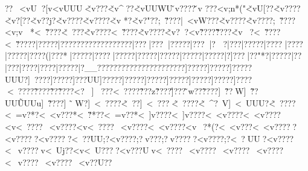 {{{{{{{{{{{{{{{{{{{{{{{{{{{{{{{{{{{{{{{{{{{{{{{{{{{{{{{{{{{{{{{{{{{{{{{{{{{{{{{{{{{{{{{{{{{{{{{{{{{{{{{{{{{{{{{{{{{{{{{{{{{{{{{{{{{{{{{{{{{{{{{{{{{{{{{{{{{{{{{{{{{{{{{{{{{{{{{{{{{{{{{{{{{{{{{{{{{{{{{{{{{{{{{{{{{{{{{{{{{{{{{{{{{{{{{{{{{{{{{{{{{{{{{{{{{{{{{{{{{{{{{{{{{{{{{{{{{{{{{{{{{{{{{{{{{{{{{{{{{{{{{{{{{{{{{{{{{{{{{{{{{{{{{{{{{{{{{{{{{{{{{{{{{{{{{{{{{{{{{{{{{{{{{{{{{{{{{{{{{{{{{{{{{{{{{{{{{{{{{{{{{{{{{{{{{{{{{{{{{{{{{{{{{{{{{{{{{{{{{{{{{{{{{{{{{{{{{{{{{{{{{{{{{{{{{{{{{{{{{{{{{{{{{{{{{{{{{{{{{{{{{{{{{{{{{{{{{{{{{{{{{{{{{{{{{{{{{{{{{{{{{{{{{{{{{{{{{{{{{{{{{{{{{{{{{{{{{{{{{{{{{{{{{{{{{{{{{{{{{{{{{{{{{{{{{{{{{{{{{{{{{{{{{{{{{{{{{{{{{{{{{{{{{{{{{{{{{{{{{{{{{{{{{{{{{{{{{{{{{{{{{{{{{{{{{{{{{{{{{{{{{{{{{{{{{{{{{{{{{{{{{{{{{{{{{{{{{{{{{{{{{{{{{{{{{{{{{{{{{{{{{{{{{{{{{{{{{{{{{{{{{{{{{{{{{{{{{{{{{{{{{{{{{{{{{{{{{{{{{{{{{{{{{{{{{{{{{{{{{{{{{{{{{{{{{{{{{{{{{{{{{{{{{{{{{{{{{{{{{{{{{{{{{{{{{{{{{{{{{{{{{{{{{{{{{{{{{{{{{{{{{{{{{{{{{{{{{{{{{{{{{{{{{{{{{{{{{{{{{{{{{{{{{{{{{{{{{{{{{{{{{{{{{{{{{{{{{{{{{{{{{{{{{{{{{{{{{{{{{{{{{{{{{{{{{{{{{{{{{{{{{{{{{{{{{{{{{{{{{{{{{{{{{{{{{{{{{{{{{{{{{{{{{{{{{{{{{{{{{{{{{{{{{{{{{{{{{{{{{{{{{{{{{{{{{{{{{{{{{{{{{{{{{{{{{{{{{{{{{{{{{{{{{{{{{{{{{{{{{{{{{{{{{{{{{{{{{{{{{{{{{{{{{{{{{{{{{{{{{{{{{{{{{{{{{{{{{{{{{{{{{{{{{{{{{{{{{{{{{{{{{{{{{{{{{{{{{{{{{{{{{{{{{{{{{{{{{{{{{{{{{{{{{{{{{{{{{{{{{{{{{{{{{{{{{{{{{{{{{{{{{{{{{{{{{{{{{{{{{{{{{{{{{{{{{{{{{{{{{{{{{{{{{{{{{{{{{{{{{{{{{{{{{{{{{{{{{{{{{{{{{{{{{{{{{{{{{{{{{{{{{{{{{{{{{{{{{{{{{{{{{{{{{{{{{{{{{{{{{{{{{{{{{{{{{{{{{{{{{{{{{{{{{{{{{{{{{{{{{{{{{{{{{{{{{{{{{{{{{{{{{{{{{{{{{{{{{{{{{{{{{{{{{{{{{{{{{{{{{{{{{{{{{{{{{{{{{{{{{{{{{{{{{{{{{{{{{{{{{{{{{{{{{{{{{{{{{{{{{{{{{{{{{{{{{{{{{{{{{{{{{{{{{{{{{{{{{{{{{{{{{{{{{{{{{{{{{{{{{{{{{{{{{{{{{{{{{{{{{{{{{{{{{{{{{{{{{{{{{{{{{{{{{{{{{{{{{{{{{{{{{{{{{{{{{{{{{{{{{{{{{{{{{{{{{{{{{{{{{{{{{{{{{{{{{{{{{{{{{{{{{{{{{{{{{{{{{{{{{{{{{{{{{{{{{{{{{{{{{{{{{{{{{{{{{{{{{{{{{{{{{{{{{{{{{{{{{{{{{{{{{{{{{{{{{{{{{{{{{{{{{{{{{{{{{{{{{{{{{{{{{{{{{{{{{{{{{{{{{{{{{{{{{{{{{{{{{{{{{{{{{{{{{{{{{{{{{{{{{{{{{{{{{{{{{{{{{{{{{{{{{{{{{{{{{{{{{{{{{{{{{{{{{{{{{{{{{{{{{{{{{{{{{{{{{{{{{{{{{{{{{{{{{{{{{{{{{{{{{{{{{{{{{{{{{{{{{{{{{{{{{{{{{{{{{{{{{{{{{{{{{{{{{{{{{{{{{{{{{{{{{{{{{{{{{{{{{{{{{{{{{{{{{{{??~<vU?[v<vUUU\v<v???}\v<v^??\v<vUUWU\vv????\vv
???<v;n *("\v<vU[??\v<v????\v<v?[??\v<v??j?\v<v????\v<v????\v<v
* ?\v<v?"??;~\v????|~<vW???\v<v????\~<v????;~\v????<v;v
*<~\v????\v<~ ???\~<v????<~\v????\~<v????\~<v??<v\~????\v\~????\v<v?<~\v????<~\v????}?|?????|?\?? ? }?\?????}?\?????}?\?????|?\??? |?\???|?\?????|?\???|?\?
?|?\???|?\?????|?\????
|?\????
|?\?????|?\????(|?\???*|?\?????|?\????|?\?????|?\?????|?\?????|?\?????|?\?????|?]??? |?\??"*?|?\?????|?\??   |?\???  |?\???? |?\????|?\?????|?\?__??}?\?????}?\?????}?\?????}?\?????]?\?????]?\?????]?\?????\?\?UUU?\?]~????]?\?????]?\???UU\?]?????]?\?????]?\?????]?\?????]?\?????]?\?????]?\????\?<~????\?\~????\?\~??\?\~????\?<? \?]~
???\?<~????\?\~???z\?\~????\?\~]???\?\~w??\?\~????]~\~??W]~\~??UU\?\~UUUu]~\~????]~\~W?]~<~????\~<~??]~<~???\~<~????\~<~^?~V]~<~UUU?\~<~????<~=v?* ?<~<v???*<~\v?*??<~=v??* <~]v????<~]v????<~<v????<~<v????<v<~????~<v????<v<~????~<v????<~<v????<v~?*(?<~<v???<~<v?????<v?????<v?????<~??UU;?<v????;?v ???;?v?????<v????;?<~?UU?<v????<~v????v<~Uj??<v<~U????<v???Uv<~????~<v????~<v????~<v????<~v????~<v????~<v??U??}}}}}}}}}}}}}}}}}}}}}}}}}}}}}}}}}}}}}}}}}}}}}}}}}}}}}}}}}}}}}}}}}}}}}}}}}}}}}}}}}}}}}}}}}}}}}}}}}}}}}}}}}}}}}}}}}}}}}}}}}}}}}}}}}}}}}}}}}}}}}}}}}}}}}}}}}}}}}}}}}}}}}}}}}}}}}}}}}}}}}}}}}}}}}}}}}}}}}}}}}}}}}}}}}}}}}}}}}}}}}}}}}}}}}}}}}}}}}}}}}}}}}}}}}}}}}}}}}}}}}}}}}}}}}}}}}}}}}}}}}}}}}}}}}}}}}}}}}}}}}}}}}}}}}}}}}}}}}}}}}}}}}}}}}}}}}}}}}}}}}}}}}}}}}}}}}}}}}}}}}}}}}}}}}}}}}}}}}}}}}}}}}}}}}}}}}}}}}}}}}}}}}}}}}}}}}}}}}}}}}}}}}}}}}}}}}}}}}}}}}}}}}}}}}}}}}}}}}}}}}}}}}}}}}}}}}}}}}}}}}}}}}}}}}}}}}}}}}}}}}}}}}}}}}}}}}}}}}}}}}}}}}}}}}}}}}}}}}}}}}}}}}}}}}}}}}}}}}}}}}}}}}}}}}}}}}}}}}}}}}}}}}}}}}}}}}}}}}}}}}}}}}}}}}}}}}}}}}}}}}}}}}}}}}}}}}}}}}}}}}}}}}}}}}}}}}}}}}}}}}}}}}}}}}}}}}}}}}}}}}}}}}}}}}}}}}}}}}}}}}}}}}}}}}}}}}}}}}}}}}}}}}}}}}}}}}}}}}}}}}}}}}}}}}}}}}}}}}}}}}}}}}}}}}}}}}}}}}}}}}}}}}}}}}}}}}}}}}}}}}}}}}}}}}}}}}}}}}}}}}}}}}}}}}}}}}}}}}}}}}}}}}}}}}}}}}}}}}}}}}}}}}}}}}}}}}}}}}}}}}}}}}}}}}}}}}}}}}}}}}}}}}}}}}}}}}}}}}}}}}}}}}}}}}}}}}}}}}}}}}}}}}}}}}}}}}}}}}}}}}}}}}}}}}}}}}}}}}}}}}}}}}}}}}}}}}}}}}}}}}}}}}}}}}}}}}}}}}}}}}}}}}}}}}}}}}}}}}}}}}}}}}}}}}}}}}}}}}}}}}}}}}}}}}}}}}}}}}}}}}}}}}}}}}}}}}}}}}}}}}}}}}}}}}}}}}}}}}}}}}}}}}}}}}}}}}}}}}}}}}}}}}}}}}}}}}}}}}}}}}}}}}}}}}}}}}}}}}}}}}}}}}}}}}}}}}}}}}}}}}}}}}}}}}}}}}}}}}}}}}}}}}}}}}}}}}}}}}}}}}}}}}}}}}}}}}}}}}}}}}}}}}}}}}}}}}}}}}}}}}}}}}}}}}}}}}}}}}}}}}}}}}}}}}}}}}}}}}}}}}}}}}}}}}}}}}}}}}}}}}}}}}}}}}}}}}}}}}}}}}}}}}}}}}}}}}}}}}}}}}}}}}}}}}}}}}}}}}}}}}}}}}}}}}}}}}}}}}}}}}}}}}}}}}}}}}}}}}}}}}}}}}}}}}}}}}}}}}}}}}}}}}}}}}}}}}}}}}}}}}}}}}}}}}}}}}}}}}}}}}}}}}}}}}}}}}}}}}}}}}}}}}}}}}}}}}}}}}}}}}}}}}}}}}}}}}}}}}}}}}}}}}}}}}}}}}}}}}}}}}}}}}}}}}}}}}}}}}}}}}}}}}}}}}}}}}}}}}}}}}}}}}}}}}}}}}}}}}}}}}}}}}}}}}}}}}}}}}}}}}}}}}}}}}}}}}}}}}}}}}}}}}}}}}}}}}}}}}}}}}}}}}}}}}}}}}}}}}}}}}}}}}}}}}}}}}}}}}}}}}}}}}}}}}}}}}}}}}}}}}}}}}}}}}}}}}}}}}}}}}}}}}}}}}}}}}}}}}}}}}}}}}}}}}}}}}}}}}}}}}}}}}}}}}}}}}}}}}}}}}}}}}}}}}}}}}}}}}}}}}}}}}}}}}}}}}}}}}}}}}}}}}}}}}}}}}}}}}}}}}}}}}}}}}}}}}}}}}}}}}}}}}}}}}}}}}}}}}}}}}}}}}}}}}}}}}}}}}}}}}}}}}}}}}}}}}}}}}}}}}}}}}}}}}}}}}}}}}}}}}}}}}}}}}}}}}}}}}}}}}}}}}}}}}}}}}}}}}}}}}}}}}}}}}}}}}}}}}}}}}}}}}}}}}}}}}}}}}}}}}}}}}}}}}}}}}}}}}}}}}}}}}}}}}}}}}}}}}}}}}}}}}}}}}}}}}}}}}}}}}}}}}}}}}}}}}}}}}}}}}}}}}}}}}}}}}}}}}}}}
